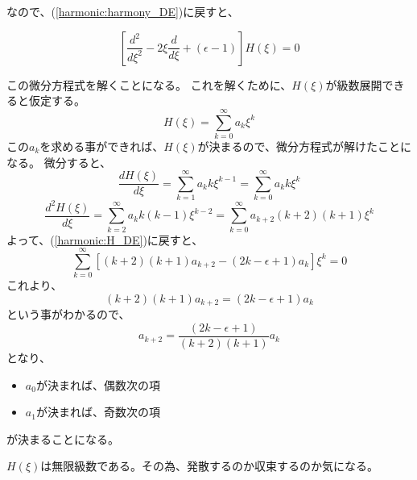 なので、(\ref{harmonic:harmony_DE})に戻すと、

\begin{equation}
  \label{harmonic:H_DE}
  \left[\dfrac{d^2}{d\xi^2} -2\xi\dfrac{d}{d\xi} + (\epsilon -1)\right]H(\xi) = 0
\end{equation}

この微分方程式を解くことになる。
これを解くために、$H(\xi)$が級数展開できると仮定する。
\begin{equation}
  H(\xi) = \sum_{k=0}^{\infty}a_k \xi^k
\end{equation}
この$a_k$を求める事ができれば、$H(\xi)$が決まるので、微分方程式が解けたことになる。
微分すると、
\begin{equation}
  \dfrac{d H(\xi)}{d\xi} = \sum_{k=1}^{\infty}a_k k\xi^{k-1} = \sum_{k=0}^{\infty}a_k k\xi^k
\end{equation}
\begin{equation}
  \dfrac{d^2 H(\xi)}{d\xi} = \sum_{k=2}^{\infty}a_k k(k-1)\xi^{k-2} = \sum_{k=0}^{\infty}a_{k+2} (k+2)(k+1)\xi^k
\end{equation}
よって、(\ref{harmonic:H_DE})に戻すと、
\begin{equation}
  \sum_{k=0}^{\infty} \left[ (k+2)(k+1)a_{k+2} - (2k - \epsilon + 1)a_k  \right] \xi^k = 0
\end{equation}
これより、
\begin{equation}
  (k+2)(k+1)a_{k+2} = (2k - \epsilon + 1)a_k
\end{equation}
という事がわかるので、
\begin{equation}
  \label{harmonic:recurrence_relation_1}
  a_{k+2} = \dfrac{(2k - \epsilon + 1)}{(k+2)(k+1)}a_k
\end{equation}
となり、
\begin{itemize}
\item $a_0$が決まれば、偶数次の項
\item $a_1$が決まれば、奇数次の項
\end{itemize}
が決まることになる。

$H(\xi)$は無限級数である。その為、発散するのか収束するのか気になる。

